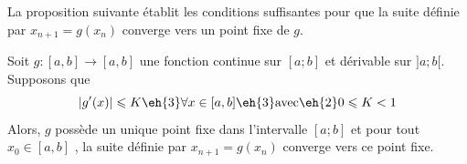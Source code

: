 %
% 
% 
%
%
%



La proposition suivante établit les conditions suffisantes pour que la suite définie par $x_{n+1}=g(x_n)$ converge vers un point fixe de $g$.

\begin{proposition}
\label{prop:existence_point_fixe}
Soit $g : [a, b] \rightarrow [a, b]$ une fonction continue sur $[a;b]$ et dérivable sur $]a;b[$.\\
Supposons que
$$\vert g^\prime(x)\vert \leqslant K \eh{3}\forall x \in [a, b] \eh{3} \textrm{avec}\eh{2} 0 \leqslant K < 1$$  
Alors, $g$ possède un unique point fixe dans l'intervalle $[a;b]$ et pour tout $x_0 \in [a, b]$ , la suite définie par
\mbox{$x_{n+1} = g(x_n)$} converge vers ce point fixe.
\end{proposition}

